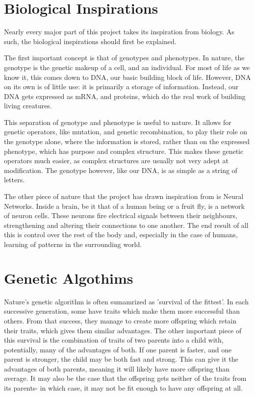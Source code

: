\documentclass[a4paper,11pt]{report}
\begin{document}
\section{Biological Inspirations}

Nearly every major part of this project takes its inspiration from biology. As such, the biological inspirations 
should first be explained. 

The first important concept is that of genotypes and phenotypes. In nature, the genotype is the genetic makeup 
of a cell, and an individual. For most of life as we know it, this comes down to DNA, our basic building block 
of life. However, DNA on its own is of little use: it is primarily a storage of information. 
Instead, our DNA gets expressed as mRNA, and proteins, which do the real work of building living creatures. 

This separation of genotype and phenotype is useful to nature. It allows for genetic operators, like 
mutation, and genetic recombination, to play their 
role on the genotype alone, where the information is stored, rather than on the expressed phenotype, which 
has purpose and complex structure. This makes these genetic operators much easier, as complex structures 
are usually not very adept at modification. The genotype however, like our DNA, is as simple as a string 
of letters. 

The other piece of nature that the project has drawn inspiration from is Neural Networks. Inside a brain, 
be it that of a human being or a fruit fly, is a network of neuron cells. These neurons fire electrical 
signals between their neighbours, strengthening and altering their connections to one another. The end 
result of all this is control over the rest of the body and, especially in the case of humans, learning
of patterns in the surrounding world. 

\section{Genetic Algothims}

Nature's genetic algorithm is often sumamrized as 'survival of the fittest'. In each successive 
generation, some have traits which make them more successful than others. From that success,
they manage to create more offspring which retain their traits, which gives them similar advantages. 
The other important piece of this survival is the combination of traits of two parents into a child
with, potentially, many of the advantages of both. If one parent is faster, and one parent is stronger, 
the child may be both fast and strong. This can give it the advantages of both 
parents, meaning it will likely have more offspring than average. 
It may also be the case that the offspring gets neither of the 
traits from its parents- in which case, it may not be fit enough to have any offspring at all.
\end{document}
